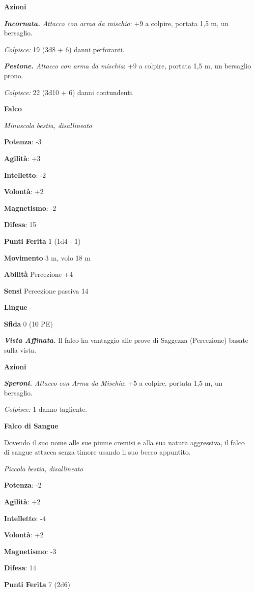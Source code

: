 \begin{multicols}{2}
\textbf{Azioni}

\emph{\textbf{Incornata.} Attacco con arma da mischia}: +9 a colpire,
portata 1,5 m, un bersaglio.

\emph{Colpisce:} 19 (3d8 + 6) danni perforanti.

\emph{\textbf{Pestone.} Attacco con arma da mischia}: +9 a colpire,
portata 1,5 m, un bersaglio prono.

\emph{Colpisce:} 22 (3d10 + 6) danni contundenti.

\textbf{Falco}

\emph{Minuscola bestia, disallineato}

\textbf{Potenza}: -3

\textbf{Agilità}: +3

\textbf{Intelletto}: -2

\textbf{Volontà}: +2

\textbf{Magnetismo}: -2

\textbf{Difesa}: 15

\textbf{Punti Ferita} 1 (1d4 - 1)

\textbf{Movimento} 3 m, volo 18 m

\textbf{Abilità} Percezione +4

\textbf{Sensi} Percezione passiva 14

\textbf{Lingue} -

\textbf{Sfida} 0 (10 PE)

\emph{\textbf{Vista Affinata.}} Il falco ha vantaggio alle prove di
Saggezza (Percezione) basate sulla vista.

\textbf{Azioni}

\emph{\textbf{Speroni.} Attacco con Arma da Mischia}: +5 a colpire,
portata 1,5 m, un bersaglio.

\emph{Colpisce:} 1 danno tagliente.

\textbf{Falco di Sangue}

Dovendo il suo nome alle sue piume cremisi e alla sua natura aggressiva,
il falco di sangue attacca senza timore usando il suo becco appuntito.

\emph{Piccola bestia, disallineato}

\textbf{Potenza}: -2

\textbf{Agilità}: +2

\textbf{Intelletto}: -4

\textbf{Volontà}: +2

\textbf{Magnetismo}: -3

\textbf{Difesa}: 14

\textbf{Punti Ferita} 7 (2d6)


\end{multicols}
